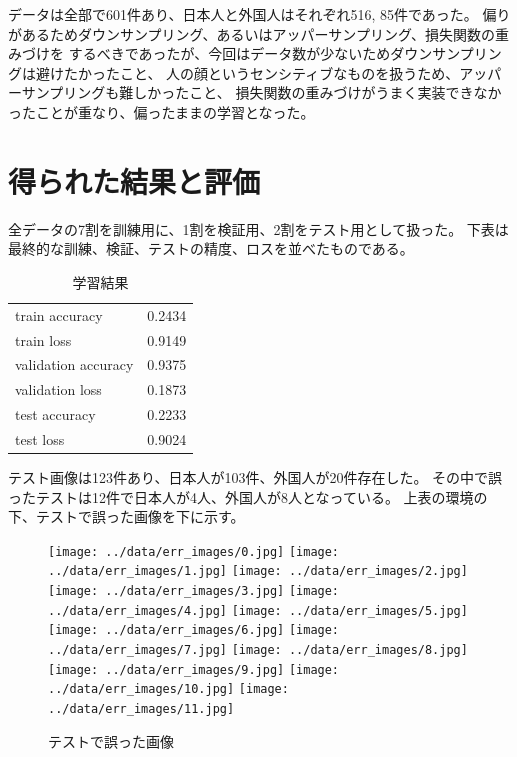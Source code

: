 \documentclass[uplatex]{jsarticle}
\begin{document}
データは全部で601件あり、日本人と外国人はそれぞれ516, 85件であった。
偏りがあるためダウンサンプリング、あるいはアッパーサンプリング、損失関数の重みづけを
するべきであったが、今回はデータ数が少ないためダウンサンプリングは避けたかったこと、
人の顔というセンシティブなものを扱うため、アッパーサンプリングも難しかったこと、
損失関数の重みづけがうまく実装できなかったことが重なり、偏ったままの学習となった。


\section{得られた結果と評価}
全データの7割を訓練用に、1割を検証用、2割をテスト用として扱った。
下表は最終的な訓練、検証、テストの精度、ロスを並べたものである。

\begin{table}[H]
  \caption{学習結果}
  \begin{center}
    \begin{tabular}{lc} \hline
      train accuracy & 0.2434 \\
      train loss & 0.9149 \\
      validation accuracy & 0.9375 \\
      validation loss & 0.1873 \\
      test accuracy & 0.2233 \\
      test loss & 0.9024 \\ \hline
    \end{tabular}
  \end{center}
\end{table}

テスト画像は123件あり、日本人が103件、外国人が20件存在した。
その中で誤ったテストは12件で日本人が4人、外国人が8人となっている。
上表の環境の下、テストで誤った画像を下に示す。

\begin{figure}[H]
  \begin{center}
    \texttt{[image: ../data/err\_images/0.jpg]}
    \texttt{[image: ../data/err\_images/1.jpg]}
    \texttt{[image: ../data/err\_images/2.jpg]}
    \texttt{[image: ../data/err\_images/3.jpg]}
    \texttt{[image: ../data/err\_images/4.jpg]}
    \texttt{[image: ../data/err\_images/5.jpg]}
    \\
    \texttt{[image: ../data/err\_images/6.jpg]}
    \texttt{[image: ../data/err\_images/7.jpg]}
    \texttt{[image: ../data/err\_images/8.jpg]}
    \texttt{[image: ../data/err\_images/9.jpg]}
    \texttt{[image: ../data/err\_images/10.jpg]}
    \texttt{[image: ../data/err\_images/11.jpg]}
    \caption{テストで誤った画像}
  \end{center}
\end{figure}
\end{document}
